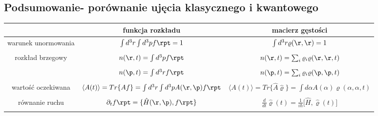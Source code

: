 \subsection{Podsumowanie- porównanie ujęcia klasycznego i kwantowego}
\begin{center}
  \begin{tabular}{ccc}  
    \toprule
        &  funkcja rozkładu & macierz gęstości \\
    \midrule
    warunek unormowania & $\int d^3r\int d^3pf\rpt=1$ &  $\int d^3r\varrho(\r,\r)=1$\\\\
  rozkład brzegowy & $n(\r,t)=\int d^3pf\rpt$ & $n(\r,t)=\sum_i\varrho_i\varrho(\r,\r,t)$\\\\
  				  & $n(\p,t)=\int d^3rf\rpt$ & $n(\p,t)=\sum_i\varrho_i\varrho(\p,\p,t)$\\\\
  wartość oczekiwana & $\langle A(t)\rangle=Tr\lbrace Af\rbrace=\int d^3r\int d^3pA(\r,\p)f\rpt$ & $\langle A(t)\rangle=Tr\lbrace \hat{A}\hat{\varrho}\rbrace=\int d\alpha A(\alpha)\varrho(\alpha,\alpha,t)$\\\\
  równanie ruchu &$ \partial_tf\rpt=\lbrace\hat{H}(\r,\p),f\rpt\rbrace$ &
 $ \frac{d}{dt}\hat{\varrho}(t)=\frac{1}{i\hbar}\Big[\hat{H},\hat{\varrho}(t)\Big]$\\\\
    \bottomrule
  \end{tabular}
\end{center}
